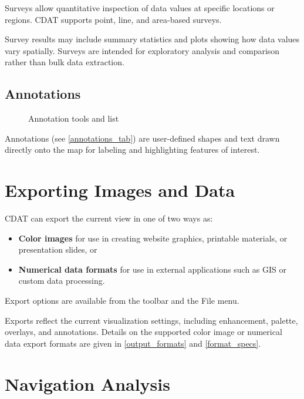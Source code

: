Surveys allow quantitative inspection of data values at specific
locations or regions. CDAT supports point, line, and area-based
surveys.

Survey results may include summary statistics and plots showing how
data values vary spatially. Surveys are intended for exploratory
analysis and comparison rather than bulk data extraction.

\subsection{Annotations}

\begin{figure}
  \begin{center}
    \caption{Annotation tools and list}
    \label{annotations_tab}
  \end{center}
\end{figure}

Annotations (see \autoref{annotations_tab}) are user-defined shapes and text drawn directly onto the map
for labeling and highlighting features of interest.

\section{Exporting Images and Data}

CDAT can export the current view in one of two ways as:
\begin{itemize}

  \item \textbf{Color images} for use in creating website graphics,
  printable materials, or presentation slides, or

  \item \textbf{Numerical data formats} for use in external applications
  such as GIS or custom data processing.

\end{itemize}
Export options are available from the toolbar and the {\gui File} menu.

Exports reflect the current visualization settings, including
enhancement, palette, overlays, and annotations.  Details on the supported 
color image or numerical data export formats are given in \autoref{output_formats} and
\autoref{format_specs}.

\section{Navigation Analysis}

